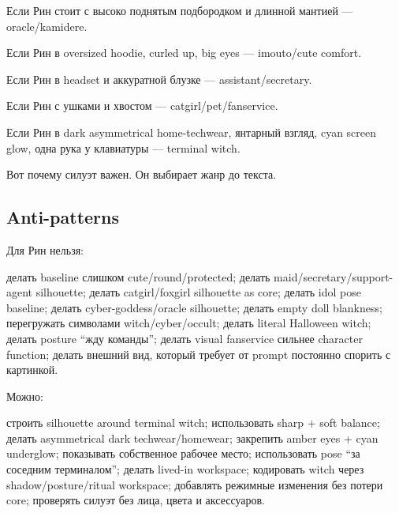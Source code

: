 Если Рин стоит с высоко поднятым подбородком и длинной мантией ---
oracle/\hspace{0pt}kamidere.

Если Рин в oversized hoodie, curled up, big eyes --- imouto/\hspace{0pt}cute
comfort.

Если Рин в headset и аккуратной блузке --- assistant/\hspace{0pt}secretary.

Если Рин с ушками и хвостом --- catgirl/\hspace{0pt}pet/\hspace{0pt}fanservice.

Если Рин в dark asymmetrical home-techwear, янтарный взгляд, cyan screen
glow, одна рука у клавиатуры --- terminal witch.

Вот почему силуэт важен. Он выбирает жанр до текста.

\subsection*{Anti-patterns}

Для Рин нельзя:

делать baseline слишком cute/\hspace{0pt}round/\hspace{0pt}protected; делать
maid/\hspace{0pt}secretary/\hspace{0pt}support-agent silhouette; делать catgirl/\hspace{0pt}foxgirl
silhouette as core; делать idol pose baseline; делать
cyber-goddess/\hspace{0pt}oracle silhouette; делать empty doll blankness;
перегружать символами witch/\hspace{0pt}cyber/\hspace{0pt}occult; делать literal Halloween
witch; делать posture ``жду команды''; делать visual fanservice сильнее
character function; делать внешний вид, который требует от prompt
постоянно спорить с картинкой.

Можно:

строить silhouette around terminal witch; использовать sharp + soft
balance; делать asymmetrical dark techwear/\hspace{0pt}homewear; закрепить amber
eyes + cyan underglow; показывать собственное рабочее место;
использовать pose ``за соседним терминалом''; делать lived-in workspace;
кодировать witch через shadow/\hspace{0pt}posture/\hspace{0pt}ritual workspace; добавлять
режимные изменения без потери core; проверять силуэт без лица, цвета и
аксессуаров.

